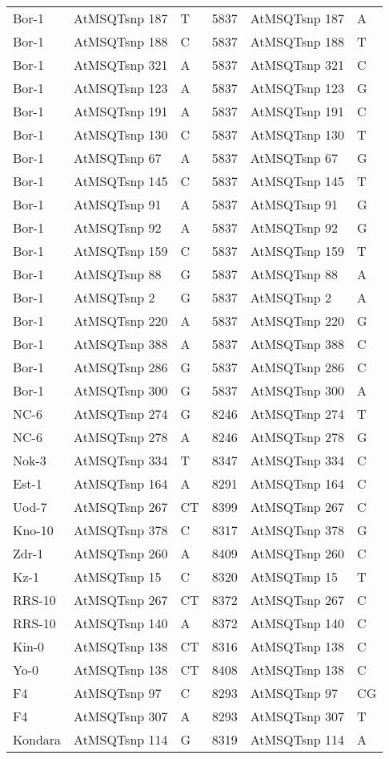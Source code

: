 \begin{center}
\begin{longtable}{|l|l|l|l|l|l|}
Bor-1&AtMSQTsnp 187&T&5837&AtMSQTsnp 187&A\\
Bor-1&AtMSQTsnp 188&C&5837&AtMSQTsnp 188&T\\
Bor-1&AtMSQTsnp 321&A&5837&AtMSQTsnp 321&C\\
Bor-1&AtMSQTsnp 123&A&5837&AtMSQTsnp 123&G\\
Bor-1&AtMSQTsnp 191&A&5837&AtMSQTsnp 191&C\\
Bor-1&AtMSQTsnp 130&C&5837&AtMSQTsnp 130&T\\
Bor-1&AtMSQTsnp 67&A&5837&AtMSQTsnp 67&G\\
Bor-1&AtMSQTsnp 145&C&5837&AtMSQTsnp 145&T\\
Bor-1&AtMSQTsnp 91&A&5837&AtMSQTsnp 91&G\\
Bor-1&AtMSQTsnp 92&A&5837&AtMSQTsnp 92&G\\
Bor-1&AtMSQTsnp 159&C&5837&AtMSQTsnp 159&T\\
Bor-1&AtMSQTsnp 88&G&5837&AtMSQTsnp 88&A\\
Bor-1&AtMSQTsnp 2&G&5837&AtMSQTsnp 2&A\\
Bor-1&AtMSQTsnp 220&A&5837&AtMSQTsnp 220&G\\
Bor-1&AtMSQTsnp 388&A&5837&AtMSQTsnp 388&C\\
Bor-1&AtMSQTsnp 286&G&5837&AtMSQTsnp 286&C\\
Bor-1&AtMSQTsnp 300&G&5837&AtMSQTsnp 300&A\\
NC-6&AtMSQTsnp 274&G&8246&AtMSQTsnp 274&T\\
NC-6&AtMSQTsnp 278&A&8246&AtMSQTsnp 278&G\\
Nok-3&AtMSQTsnp 334&T&8347&AtMSQTsnp 334&C\\
Est-1&AtMSQTsnp 164&A&8291&AtMSQTsnp 164&C\\
Uod-7&AtMSQTsnp 267&CT&8399&AtMSQTsnp 267&C\\
Kno-10&AtMSQTsnp 378&C&8317&AtMSQTsnp 378&G\\
Zdr-1&AtMSQTsnp 260&A&8409&AtMSQTsnp 260&C\\
Kz-1&AtMSQTsnp 15&C&8320&AtMSQTsnp 15&T\\
RRS-10&AtMSQTsnp 267&CT&8372&AtMSQTsnp 267&C\\
RRS-10&AtMSQTsnp 140&A&8372&AtMSQTsnp 140&C\\
Kin-0&AtMSQTsnp 138&CT&8316&AtMSQTsnp 138&C\\
Yo-0&AtMSQTsnp 138&CT&8408&AtMSQTsnp 138&C\\
F4&AtMSQTsnp 97&C&8293&AtMSQTsnp 97&CG\\
F4&AtMSQTsnp 307&A&8293&AtMSQTsnp 307&T\\
Kondara&AtMSQTsnp 114&G&8319&AtMSQTsnp 114&A\\
\hline
\end{longtable}
\end{center}

